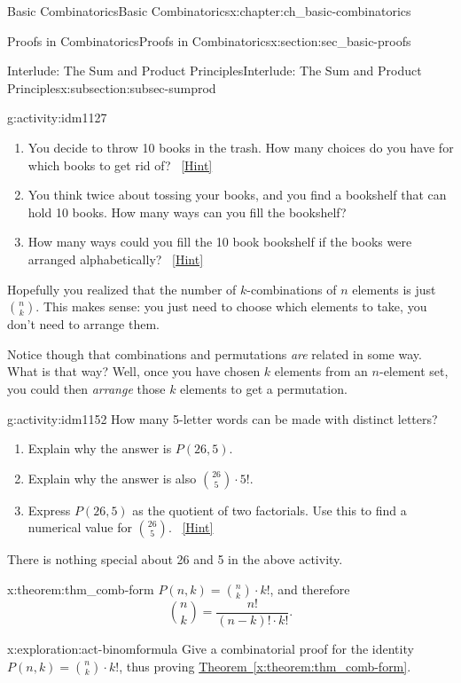 \documentclass[oneside,10pt,]{book}
\numberwithin{equation}{chapter}
\begin{document}
\begin{chapterptx}{Basic Combinatorics}{}{Basic Combinatorics}{}{}{x:chapter:ch_basic-combinatorics}
\begin{sectionptx}{Proofs in Combinatorics}{}{Proofs in Combinatorics}{}{}{x:section:sec_basic-proofs}
\begin{subsectionptx}{Interlude: The Sum and Product Principles}{}{Interlude: The Sum and Product Principles}{}{}{x:subsection:subsec-sumprod}
\begin{activity}{}{g:activity:idm1127}
\begin{enumerate}[font=\bfseries,label=(\alph*),ref=\alph*]
\item{}You decide to throw 10 books in the trash.  How many choices do you have for which books to get rid of?%
\qquad~\hfill{\tiny\hyperlink{g:hint:idm1133-back}{[Hint]}}\item{}You think twice about tossing your books, and you find a bookshelf that can hold 10 books.  How many ways can you fill the bookshelf?%
\item{}How many ways could you fill the 10 book bookshelf if the books were arranged alphabetically?%
\qquad~\hfill{\tiny\hyperlink{g:hint:idm1140-back}{[Hint]}}\end{enumerate}
\end{activity}
Hopefully you realized that the number of \(k\)-combinations of \(n\) elements is just \(\binom{n}{k}\).  This makes sense: you just need to choose which elements to take, you don't need to arrange them.%
\par
Notice though that combinations and permutations \emph{are} related in some way.  What is that way?  Well, once you have chosen \(k\) elements from an \(n\)-element set, you could then \emph{arrange} those \(k\) elements to get a permutation.%
\begin{activity}{}{g:activity:idm1152}%
How many 5-letter words can be made with distinct letters?%
\begin{enumerate}[font=\bfseries,label=(\alph*),ref=\alph*]
\item{}Explain why the answer is \(P(26,5)\).%
\item{}Explain why the answer is also \(\binom{26}{5}\cdot 5!\).%
\item{}Express \(P(26,5)\) as the quotient of two factorials.  Use this to find a numerical value for \(\binom{26}{5}\).%
\qquad~\hfill{\tiny\hyperlink{g:hint:idm1166-back}{[Hint]}}\end{enumerate}
\end{activity}
There is nothing special about 26 and 5 in the above activity.%
\begin{theorem}{}{}{x:theorem:thm_comb-form}%
\(P(n,k) = \binom{n}{k}\cdot k!\), and therefore%
\begin{equation*}
\binom{n}{k} = \frac{n!}{(n-k)!\cdot k!}\text{.}
\end{equation*}
%
\end{theorem}
\begin{exploration}{}{x:exploration:act-binomformula}%
Give a combinatorial proof for the identity \(P(n,k) = \binom{n}{k}\cdot k!\), thus proving \hyperref[x:theorem:thm_comb-form]{Theorem~\ref{x:theorem:thm_comb-form}}.%

\end{exploration}
\end{subsectionptx}
\end{sectionptx}
\end{chapterptx}
\end{document}
